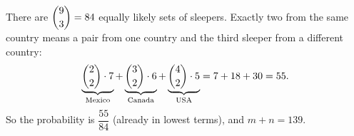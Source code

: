 There are $\dbinom93=84$ equally likely sets of sleepers. Exactly two from the same country means a pair from one country and the third sleeper from a different country:
\[\underbrace{\dbinom22\cdot7}_{\text{Mexico}}+\underbrace{\dbinom32\cdot6}_{\text{Canada}}+\underbrace{\dbinom42\cdot5}_{\text{USA}}=7+18+30=55.\]
So the probability is $\dfrac{55}{84}$ (already in lowest terms), and $m+n=\boxed{139}$.
